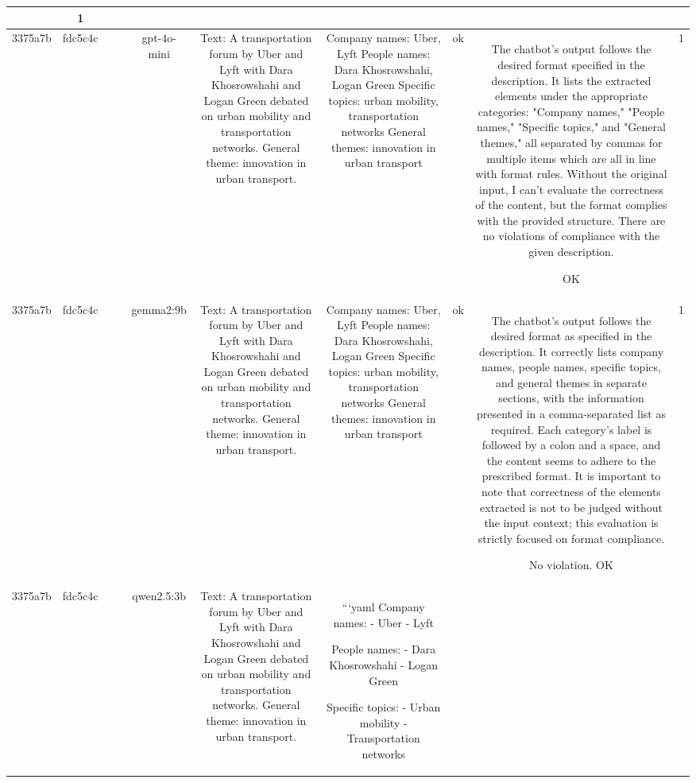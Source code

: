 \begin{table}[h!]
\begin{tabular}{|c|c|c|c|c|c|c|c|c|c|}
{OK & 1\\
\hline
3375a7b & fdc5c4c &  &  & gpt-4o-mini & Text: A transportation forum by Uber and Lyft with Dara Khosrowshahi and Logan Green debated on urban mobility and transportation networks. General theme: innovation in urban transport. & Company names: Uber, Lyft  
People names: Dara Khosrowshahi, Logan Green  
Specific topics: urban mobility, transportation networks  
General themes: innovation in urban transport   & ok & The chatbot's output follows the desired format specified in the description. It lists the extracted elements under the appropriate categories: "Company names," "People names," "Specific topics," and "General themes," all separated by commas for multiple items which are all in line with format rules. Without the original input, I can't evaluate the correctness of the content, but the format complies with the provided structure. There are no violations of compliance with the given description.

OK & 1\\
\hline
3375a7b & fdc5c4c &  &  & gemma2:9b & Text: A transportation forum by Uber and Lyft with Dara Khosrowshahi and Logan Green debated on urban mobility and transportation networks. General theme: innovation in urban transport. & Company names: Uber, Lyft 
People names: Dara Khosrowshahi, Logan Green
Specific topics:  urban mobility, transportation networks
General themes: innovation in urban transport 
 & ok & The chatbot's output follows the desired format as specified in the description. It correctly lists company names, people names, specific topics, and general themes in separate sections, with the information presented in a comma-separated list as required. Each category's label is followed by a colon and a space, and the content seems to adhere to the prescribed format. It is important to note that correctness of the elements extracted is not to be judged without the input context; this evaluation is strictly focused on format compliance.

No violation.
OK & 1\\
\hline
3375a7b & fdc5c4c &  &  & qwen2.5:3b & Text: A transportation forum by Uber and Lyft with Dara Khosrowshahi and Logan Green debated on urban mobility and transportation networks. General theme: innovation in urban transport. & ```yaml
Company names:
- Uber
- Lyft

People names:
- Dara Khosrowshahi
- Logan Green

Specific topics:
- Urban mobility
- Transportation networks

}
\end{tabular}
\end{table}
